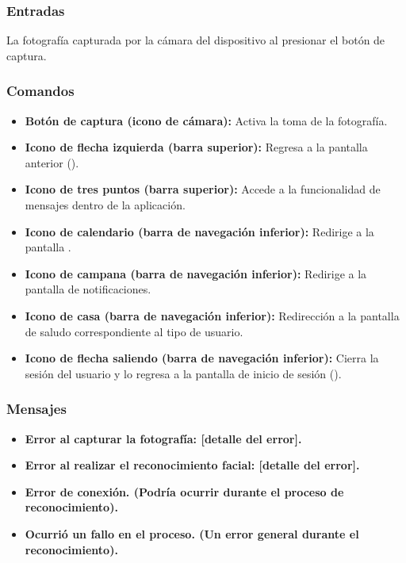 \subsubsection{Entradas}
La fotografía capturada por la cámara del dispositivo al presionar el botón de captura.

\subsubsection{Comandos}
\begin{itemize}
	\item \textbf{Botón de captura (icono de cámara):} Activa la toma de la fotografía.
	\item \textbf{Icono de flecha izquierda (barra superior):} Regresa a la pantalla anterior ().
	\item \textbf{Icono de tres puntos (barra superior):} Accede a la funcionalidad de mensajes dentro de la aplicación.
	\item \textbf{Icono de calendario (barra de navegación inferior):} Redirige a la pantalla .
	\item \textbf{Icono de campana (barra de navegación inferior):} Redirige a la pantalla de notificaciones.
	\item \textbf{Icono de casa (barra de navegación inferior):} Redirección a la pantalla de saludo correspondiente al tipo de usuario.
	\item \textbf{Icono de flecha saliendo (barra de navegación inferior):} Cierra la sesión del usuario y lo regresa a la pantalla de inicio de sesión ().
\end{itemize}

\subsubsection{Mensajes}
\begin{itemize}
	\item \textbf{Error al capturar la fotografía: [detalle del error].}
	\item \textbf{Error al realizar el reconocimiento facial: [detalle del error].}
	\item \textbf{Error de conexión. (Podría ocurrir durante el proceso de reconocimiento).}
	\item \textbf{Ocurrió un fallo en el proceso. (Un error general durante el reconocimiento).}
\end{itemize}
